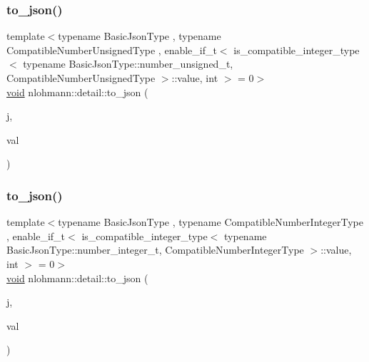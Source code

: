 \subsubsection{\texorpdfstring{to\+\_\+json()}{to\_json()}\hspace{0.1cm}{\footnotesize\ttfamily [5/17]}}
{\footnotesize\ttfamily template$<$typename Basic\+Json\+Type , typename Compatible\+Number\+Unsigned\+Type , enable\+\_\+if\+\_\+t$<$ is\+\_\+compatible\+\_\+integer\+\_\+type$<$ typename Basic\+Json\+Type\+::number\+\_\+unsigned\+\_\+t, Compatible\+Number\+Unsigned\+Type $>$\+::value, int $>$  = 0$>$ \\
\hyperlink{namespacenlohmann_1_1detail_a59fca69799f6b9e366710cb9043aa77d}{void} nlohmann\+::detail\+::to\+\_\+json (\begin{DoxyParamCaption}\item[{Basic\+Json\+Type \&}]{j,  }\item[{Compatible\+Number\+Unsigned\+Type}]{val }\end{DoxyParamCaption})\hspace{0.3cm}{\ttfamily [noexcept]}}

\mbox{\label{namespacenlohmann_1_1detail_a91fe576be579c8c2fdd14610605c6dd2}} 
\subsubsection{\texorpdfstring{to\+\_\+json()}{to\_json()}\hspace{0.1cm}{\footnotesize\ttfamily [6/17]}}
{\footnotesize\ttfamily template$<$typename Basic\+Json\+Type , typename Compatible\+Number\+Integer\+Type , enable\+\_\+if\+\_\+t$<$ is\+\_\+compatible\+\_\+integer\+\_\+type$<$ typename Basic\+Json\+Type\+::number\+\_\+integer\+\_\+t, Compatible\+Number\+Integer\+Type $>$\+::value, int $>$  = 0$>$ \\
\hyperlink{namespacenlohmann_1_1detail_a59fca69799f6b9e366710cb9043aa77d}{void} nlohmann\+::detail\+::to\+\_\+json (\begin{DoxyParamCaption}\item[{Basic\+Json\+Type \&}]{j,  }\item[{Compatible\+Number\+Integer\+Type}]{val }\end{DoxyParamCaption})\hspace{0.3cm}{\ttfamily [noexcept]}}

